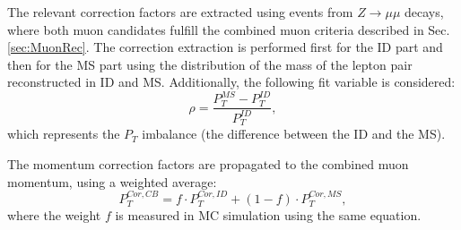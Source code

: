 The relevant correction factors are extracted using events from $Z \to \mu \mu$ decays, where both muon candidates fulfill the combined muon criteria described in Sec.\ref{sec:MuonRec}. The correction extraction is performed first for the ID part and then for the MS part using the distribution of the mass of the lepton pair reconstructed in ID and MS. Additionally, the following fit variable is considered:
\begin{equation}
\rho = \frac{P_T^{MS}-P_T^{ID}}{P_T^{ID}},
\end{equation}
which represents the $P_T$ imbalance (the difference between the ID and the MS). 

The momentum correction factors are propagated to the combined muon momentum, using a weighted average:
\begin{equation}
P_T^{Cor,CB}= f\cdot P_T^{Cor,ID}+(1-f) \cdot P_T^{Cor,MS},
\end{equation}
where the weight $f$ is measured in MC simulation using the same equation. 
